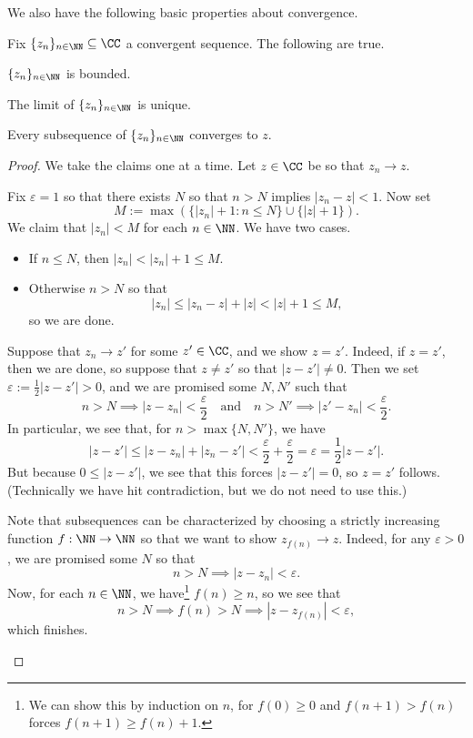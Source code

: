 We also have the following basic properties about convergence.
\begin{proposition}
	Fix $\{z_n\}_{n\in\NN}\subseteq\CC$ a convergent sequence. The following are true.
	\begin{listalph}
		\item $\{z_n\}_{n\in\NN}$ is bounded.
		\item The limit of $\{z_n\}_{n\in\NN}$ is unique.
		\item Every subsequence of $\{z_n\}_{n\in\NN}$ converges to $z$.
	\end{listalph}
\end{proposition}
\begin{proof}
	We take the claims one at a time. Let $z\in\CC$ be so that $z_n\to z$.
	\begin{listalph}
		\item Fix $\varepsilon=1$ so that there exists $N$ so that $n>N$ implies $|z_n-z|<1$. Now set
		\[M:=\max(\{|z_n|+1:n\le N\}\cup\{|z|+1\}).\]
		We claim that $|z_n|<M$ for each $n\in\NN$. We have two cases.
		\begin{itemize}
			\item If $n\le N$, then $|z_n|<|z_n|+1\le M$.
			\item Otherwise $n>N$ so that
			\[|z_n|\le|z_n-z|+|z|<|z|+1\le M,\]
			so we are done.
		\end{itemize}

		\item Suppose that $z_n\to z'$ for some $z'\in\CC$, and we show $z=z'$. Indeed, if $z=z'$, then we are done, so suppose that $z\ne z'$ so that $|z-z'|\ne0$. Then we set $\varepsilon:=\frac12|z-z'|>0$, and we are promised some $N,N'$ such that
		\[n>N\implies|z-z_n|<\frac\varepsilon2\quad\text{and}\quad n>N'\implies|z'-z_n|<\frac\varepsilon2.\]
		In particular, we see that, for $n>\max\{N,N'\}$, we have
		\[|z-z'|\le|z-z_n|+|z_n-z'|<\frac\varepsilon2+\frac\varepsilon2=\varepsilon=\frac12|z-z'|.\]
		But because $0\le|z-z'|$, we see that this forces $|z-z'|=0$, so $z=z'$ follows. (Technically we have hit contradiction, but we do not need to use this.)

		\item Note that subsequences can be characterized by choosing a strictly increasing function $f:\NN\to\NN$ so that we want to show $z_{f(n)}\to z$. Indeed, for any $\varepsilon>0$, we are promised some $N$ so that
		\[n>N\implies|z-z_n|<\varepsilon.\]
		Now, for each $n\in\NN$, we have\footnote{We can show this by induction on $n$, for $f(0)\ge0$ and $f(n+1)>f(n)$ forces $f(n+1)\ge f(n)+1$.} $f(n)\ge n$, so we see that
		\[n>N\implies f(n)>N\implies|z-z_{f(n)}|<\varepsilon,\]
		which finishes.
		\qedhere
	\end{listalph}
\end{proof}

